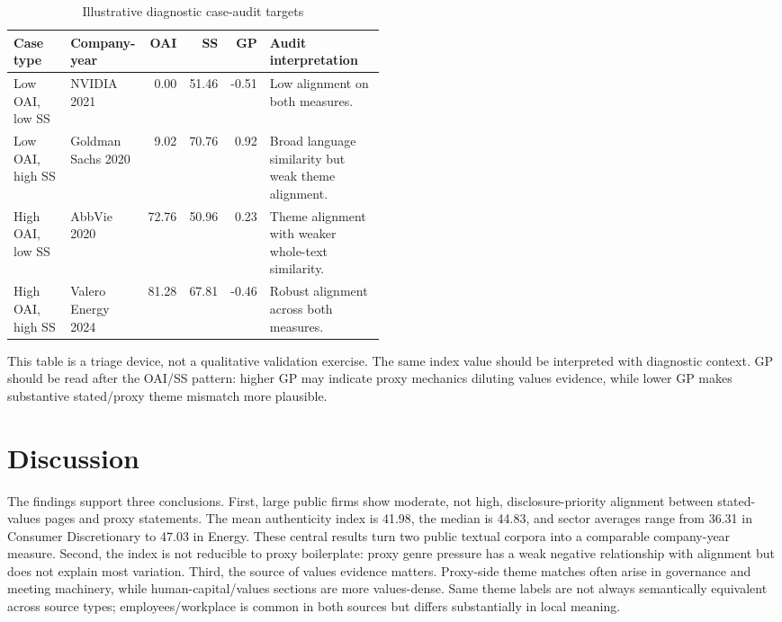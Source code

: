 \documentclass[11pt]{article}
\begin{document}
\begin{table}[H]
\centering
\scriptsize
\caption{Illustrative diagnostic case-audit targets}
\label{tab:case-audit}
\setlength{\tabcolsep}{3pt}
\renewcommand{\arraystretch}{1.12}
\begin{tabular}{l
                >{\raggedright\arraybackslash}p{0.17\linewidth}
                rrr
                >{\raggedright\arraybackslash}p{0.31\linewidth}}
\toprule
Case type & Company-year & OAI & SS & GP & Audit interpretation \\
\midrule
Low OAI, low SS & NVIDIA 2021 & 0.00 & 51.46 & -0.51 & Low alignment on both measures. \\
Low OAI, high SS & Goldman Sachs 2020 & 9.02 & 70.76 & 0.92 & Broad language similarity but weak theme alignment. \\
High OAI, low SS & AbbVie 2020 & 72.76 & 50.96 & 0.23 & Theme alignment with weaker whole-text similarity. \\
High OAI, high SS & Valero Energy 2024 & 81.28 & 67.81 & -0.46 & Robust alignment across both measures. \\
\bottomrule
\end{tabular}
\end{table}

This table is a triage device, not a qualitative validation exercise. The same index value should be
interpreted with diagnostic context. GP should be read after the OAI/SS pattern: higher GP may
indicate proxy mechanics diluting values evidence, while lower GP makes substantive stated/proxy
theme mismatch more plausible.

\section{Discussion}

The findings support three conclusions. First, large public firms show moderate, not high,
disclosure-priority alignment between stated-values pages and proxy statements. The mean
authenticity index is 41.98, the median is 44.83, and sector averages range from 36.31 in Consumer
Discretionary to 47.03 in Energy. These central results turn two public textual corpora into a
comparable company-year measure. Second, the index is not reducible to proxy boilerplate: proxy
genre pressure has a weak negative relationship with alignment but does not explain most variation.
Third, the source of values evidence matters. Proxy-side theme matches often arise in governance and
meeting machinery, while human-capital/values sections are more values-dense. Same theme labels are
not always semantically equivalent across source types; employees/workplace is common in both
sources but differs substantially in local meaning.
\end{document}
